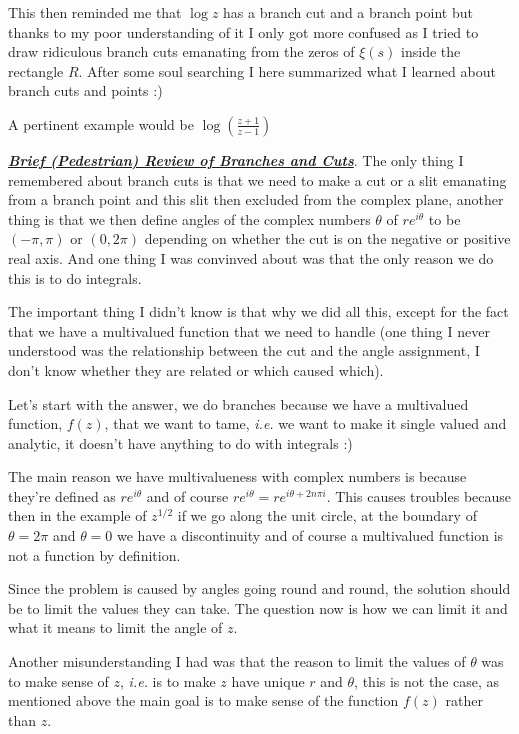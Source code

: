 \documentclass[aps,preprint,preprintnumbers,nofootinbib,showpacs,prd]{revtex4-1}
\newcommand{\ie}{{\it i.e.} }
\begin{document}
This then reminded me that $\log z$ has a branch cut and a branch point but thanks to my poor understanding of it I only got more confused as I tried to draw ridiculous branch cuts emanating from the zeros of $\xi(s)$ inside the rectangle $R$. After some soul searching I here summarized what I learned about branch cuts and points :)


A pertinent example would be $\log\left ( \tfrac{z+1}{z-1}\right )$


\bigskip
\underline{\textit{\textbf{Brief (Pedestrian) Review of Branches and Cuts}}}. The only thing I remembered about branch cuts is that we need to make a cut or a slit emanating from a branch point and this slit then excluded from the complex plane, another thing is that we then define angles of the complex numbers $\theta$ of $r e^{i\theta}$ to be $(-\pi,\pi)$ or $(0,2\pi)$ depending on whether the cut is on the negative or positive real axis. And one thing I was convinved about was that the only reason we do this is to do integrals.

The important thing I didn't know is that why we did all this, except for the fact that we have a multivalued function that we need to handle (one thing I never understood was the relationship between the cut and the angle assignment, I don't know whether they are related or which caused which).

Let's start with the answer, we do branches because we have a multivalued function, $f(z)$, that we want to tame, \ie we want to make it single valued and analytic, it doesn't have anything to do with integrals :)

The main reason we have multivalueness with complex numbers is because they're defined as $re^{i\theta}$ and of course $re^{i\theta} = re^{i\theta + 2n\pi i}$. This causes troubles because then in the example of $z^{1/2}$ if we go along the unit circle, at the boundary of $\theta=2\pi$ and $\theta=0$ we have a discontinuity and of course a multivalued function is not a function by definition.

Since the problem is caused by angles going round and round, the solution should be to limit the values they can take. The question now is how we can limit it and what it means to limit the angle of $z$.

Another misunderstanding I had was that the reason to limit the values of $\theta$ was to make sense of $z$, \ie is to make $z$ have unique $r$ and $\theta$, this is not the case, as mentioned above the main goal is to make sense of the function $f(z)$ rather than $z$.
\end{document}
